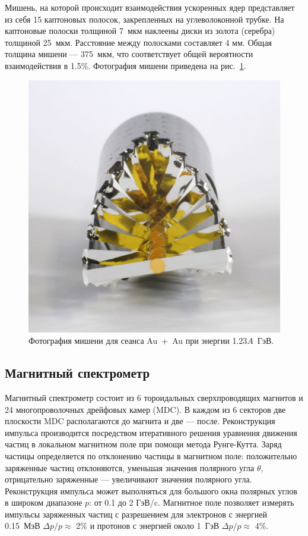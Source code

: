 Мишень, на которой происходит взаимодействия ускоренных ядер представляет из себя 15 каптоновых полосок, закрепленных на углеволоконной трубке.
На каптоновые полоски толщиной 7~мкм наклеены диски из золота (серебра) толщиной 25~мкм.
Расстояние между полосками составляет 4 мм. 
Общая толщина мишени --- 375~мкм, что соответствует общей вероятности взаимодействия в 1.5\%.
Фотография мишени приведена на рис.~\ref{fig:hades_target}. 
%
\begin{figure}[ht]
\begin{center}
\includegraphics[width=0.55\linewidth]{images/hades_target.jpg}
\caption{ Фотография мишени для сеанса Au~+~Au при энергии 1.23$A$~ГэВ.  }
\label{fig:hades_target}
\end{center}
\end{figure}

\subsection{ Магнитный спектрометр }

Магнитный спектрометр состоит из 6 тороидальных сверхпроводящих магнитов и 24 многопроволочных дрейфовых камер (MDC).
В каждом из 6 секторов две плоскости MDC располагаются до магнита и две --- после. 
Реконструкция импульса производится посредством итеративного решения уравнения движения частиц в локальном магнитном поле при помощи метода Рунге-Кутта.
Заряд частицы определяется по отклонению частицы в магнитном поле: положительно заряженные частиц отклоняются, уменьшая значения полярного угла $\theta$, отрицательно заряженные --- увеличивают значения полярного угла.
Реконструкция импульса может выполняться для большого окна полярных углов в широком диапазоне $p$: от 0.1 до 2 ГэВ/c.
Магнитное поле позволяет измерять импульсы заряженных частиц с разрешением для электронов с энергией 0.15~МэВ $\Delta p/p \approx$ 2\% и протонов с энергией около 1~ГэВ $\Delta p/p \approx$ 4\%.  

